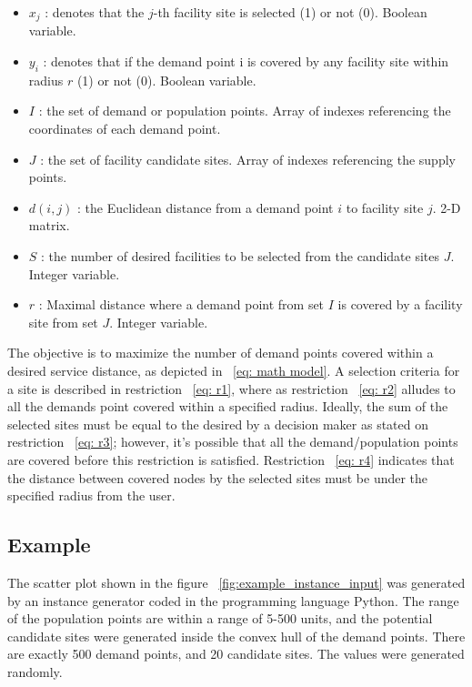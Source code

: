 \documentclass[11pt, a4paper]{article}
\begin{document}
\begin{itemize}
	\item $x_{j}$ : denotes that the $j$-th facility site is selected (1) or not (0). Boolean variable.
	\item $y_{i}$ : denotes that if the demand point i is covered by any facility site within radius $r$ (1) or not (0). Boolean variable.
	\item $I$ : the set of demand or population points. Array of indexes referencing the coordinates of each demand point.
	\item $J$ : the set of facility candidate sites. Array of indexes referencing the supply points.
	\item $d(i,j)$ : the Euclidean distance from a demand point $i$ to facility site $j$. 2-D matrix.
	\item $S$ : the number of desired facilities to be selected from the candidate sites $J$. Integer variable.
	\item $r$ : Maximal distance where a demand point from set $I$ is covered by a facility site from set $J$. Integer variable.
\end{itemize}
The objective is to maximize the number of demand points covered within a desired service distance, as depicted in ~\ref{eq: math model}.
A selection criteria for a site is described in restriction ~\ref{eq: r1}, where as restriction ~\ref{eq: r2} alludes to all the demands point covered within a specified radius. Ideally, the sum of the selected sites must be equal to the desired by a decision maker as stated on restriction ~\ref{eq: r3}; however, it's possible that all the demand/population points are covered before this restriction is satisfied. Restriction ~\ref{eq: r4} indicates that the distance between covered nodes by the selected sites must be under the specified radius from the user.

\subsection{Example}
The scatter plot shown in the figure ~\ref{fig:example_instance_input} was generated by an instance generator coded in the programming language Python. The range of the population points are within a range of 5-500 units, and the potential candidate sites were generated inside the convex hull of the demand points. There are exactly 500 demand points, and 20 candidate sites. The values were generated randomly.
\end{document}
